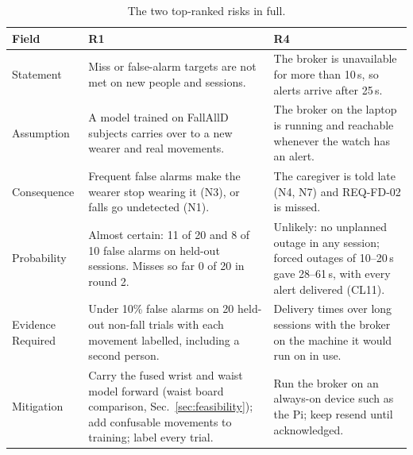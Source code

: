 
\begin{table}[!t]
\centering
\scriptsize
\renewcommand{\arraystretch}{1.15}
\setlength{\tabcolsep}{3pt}
\caption{The two top-ranked risks in full.}
\label{tab:toprisks}
\begin{tabularx}{\linewidth}{@{}L{0.14} Y Y@{}}
\toprule
Field & R1 & R4 \\
\midrule
Statement & Miss or false-alarm targets are not met on new people and sessions. & The broker is unavailable for more than 10\,s, so alerts arrive after 25\,s. \\
Assumption & A model trained on FallAllD subjects carries over to a new wearer and real movements. & The broker on the laptop is running and reachable whenever the watch has an alert. \\
Consequence & Frequent false alarms make the wearer stop wearing it (N3), or falls go undetected (N1). & The caregiver is told late (N4, N7) and REQ-FD-02 is missed. \\
Probability & Almost certain: 11 of 20 and 8 of 10 false alarms on held-out sessions. Misses so far 0 of 20 in round 2. & Unlikely: no unplanned outage in any session; forced outages of 10--20\,s gave 28--61\,s, with every alert delivered (CL11). \\
Evidence Required & Under 10\% false alarms on 20 held-out non-fall trials with each movement labelled, including a second person. & Delivery times over long sessions with the broker on the machine it would run on in use. \\
Mitigation & Carry the fused wrist and waist model forward (waist board comparison, Sec.~\ref{sec:feasibility}); add confusable movements to training; label every trial. & Run the broker on an always-on device such as the Pi; keep resend until acknowledged. \\
\bottomrule
\end{tabularx}
\end{table}
